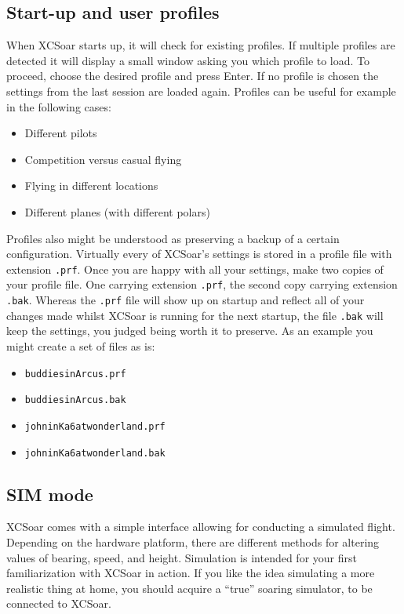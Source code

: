 \subsection*{Start-up and user profiles}\label{sec:profiles}
When XCSoar starts up, it will check for existing profiles. If multiple
profiles are detected it will display a small window asking you which profile
to load. To proceed, choose the desired profile and press Enter. If no
profile is chosen the settings from the last session are loaded again. Profiles
can be useful for example in the following cases:
\begin{itemize}
\item Different pilots
\item Competition versus casual flying
\item Flying in different locations
\item Different planes (with different polars)
\end{itemize}
Profiles also might be understood as preserving a backup of a certain 
configuration. Virtually every of XCSoar's settings is stored in a profile 
file with extension \texttt{.prf}. Once you are happy with all your settings, 
make two copies of your profile file. One carrying extension \texttt{.prf}, 
the second copy carrying extension \texttt{.bak}.
Whereas the \texttt{.prf} file will show up on startup and reflect all of 
your changes made whilst XCSoar is running for the next startup, the file 
\texttt{.bak} will keep the settings, you judged being worth it to preserve. 
As an example you might create a set of files as is:
\begin{itemize}
\item \texttt{buddiesinArcus.prf}
\item \texttt{buddiesinArcus.bak}
\item \texttt{johninKa6atwonderland.prf}
\item \texttt{johninKa6atwonderland.bak}
\end{itemize}

\subsection*{SIM mode}
XCSoar comes with a simple interface allowing for conducting a simulated 
flight. Depending on the hardware platform, there are different 
methods for altering values of bearing, speed, and height.  Simulation is
intended for your first familiarization with XCSoar in action. If you like the 
idea simulating a more realistic thing at home, you should acquire a ``true''
soaring simulator, to be connected to XCSoar.

